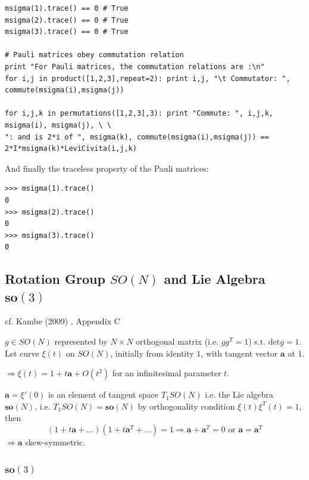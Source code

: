 \documentclass[10pt]{amsart}
\begin{document}
\begin{multicols*}{2}
\begin{lstlisting}
msigma(1).trace() == 0 # True
msigma(2).trace() == 0 # True
msigma(3).trace() == 0 # True

# Pauli matrices obey commutation relation
print "For Pauli matrices, the commutation relations are :\n"
for i,j in product([1,2,3],repeat=2): print i,j, "\t Commutator: ", commute(msigma(i),msigma(j))

for i,j,k in permutations([1,2,3],3): print "Commute: ", i,j,k, msigma(i), msigma(j), \ \
": and is 2*i of ", msigma(k), commute(msigma(i),msigma(j)) == 2*I*msigma(k)*LeviCivita(i,j,k)

\end{lstlisting}

And finally the traceless property of the Pauli matrices:
\begin{lstlisting}
>>> msigma(1).trace()
0
>>> msigma(2).trace()
0
>>> msigma(3).trace()
0
\end{lstlisting} 

\subsection{Rotation Group $SO(N)$ and Lie Algebra $\textbf{so}(3)$}

cf. Kambe (2009) \cite{TKambe2009}, Appendix C

$g \in SO(N)$ represented by $N\times N$ orthogonal matrix (i.e. $gg^T = 1$) s.t. $\text{det}g = 1$. \\

Let curve $\xi(t)$ on $SO(N)$, initially from identity $1$, with tangent vector $\mathbf{a}$ at $1$.

$\Longrightarrow \xi(t) = 1 + t\mathbf{a} + O(t^2)$ for an infinitesimal parameter $t$.

$\mathbf{a} = \xi'(0)$ is an element of tangent space $T_1 SO(N)$ i.e. the Lie algebra $\mathbf{so}(N)$, i.e. $T_1SO(N) = \mathbf{so}(N)$ by orthogonality condition $\xi(t) \xi^T(t) = 1$, then
\begin{equation}\label{Eq:SO(N)LieAlgebraIsSkewSymmetric}
(1 + t\mathbf{a} + \dots ) (1 + t\mathbf{a}^T + \dots )  = 1 \Longrightarrow \mathbf{a} + \mathbf{a}^T = 0 \text{ or } \mathbf{a} = \mathbf{a}^T
\end{equation}
$\Longrightarrow  \mathbf{a}$ skew-symmetric.

\subsubsection{$\mathbf{so}(3)$}


\end{multicols*}
\end{document}
